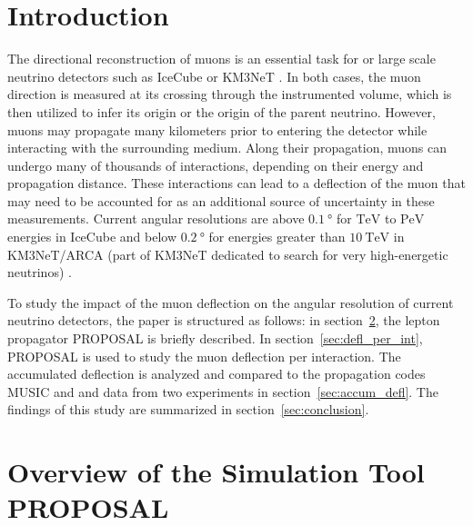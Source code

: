 \section{Introduction}\label{sec:introduction}

The directional reconstruction of muons is an essential task for  or large scale neutrino detectors such as IceCube 
\cite{IceCube_Instrumentation} or KM3NeT \cite{KM3NeT_Design}. In both cases, the muon direction is measured at its crossing through the instrumented volume, which is then utilized to infer its origin or the origin of the parent neutrino. 
However, muons may propagate many kilometers prior to entering the detector while interacting with the surrounding medium. 
Along their propagation, muons can undergo many of thousands 
of interactions, depending on their energy and propagation distance. 
These interactions can lead to a deflection of the muon that may need to be accounted for as an additional source of uncertainty in these measurements. 
Current angular resolutions are above
$\SI{0.1}{\degree}$ for  
$\si{\tera\electronvolt}$ to $\si{\peta\electronvolt}$ energies in IceCube 
\cite{IceCube_Resolution2021} 
and below 
$\SI{0.2}{\degree}$ for energies greater than $\SI{10}{\tera\electronvolt}$ in 
KM3NeT/ARCA (part of KM3NeT dedicated to search for very high-energetic neutrinos) \cite{KM3NeT_Resolution2021}.

To study the impact of the muon deflection on the angular resolution 
of current neutrino detectors, 
the paper is structured as follows: in section~\ref{sec:proposal},
the lepton propagator PROPOSAL is briefly described. In section~\ref{sec:defl_per_int},
PROPOSAL \cite{koehne2013proposal, dunsch_2018_proposal_improvements} is used to study the muon deflection per interaction.
The accumulated deflection is analyzed and compared to the propagation codes
MUSIC  and   and data from two experiments in section~\ref{sec:accum_defl}. The findings of this study
are summarized in section~\ref{sec:conclusion}.

\section{Overview of the Simulation Tool PROPOSAL}\label{sec:proposal}

